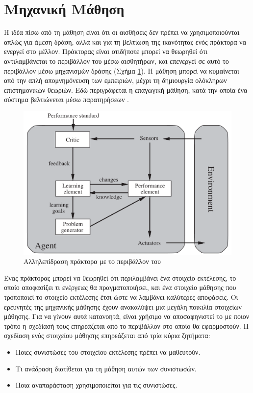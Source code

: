 \section{Μηχανική Μάθηση}

Η ιδέα πίσω από τη μάθηση είναι ότι οι αισθήσεις δεν πρέπει να χρησιμοποιούνται απλώς για άμεση δράση, αλλά και για τη βελτίωση της ικανότητας ενός πράκτορα να ενεργεί στο μέλλον. Πράκτορας είναι οτιδήποτε μπορεί να θεωρηθεί ότι αντιλαμβάνεται το περιβάλλον του μέσω αισθητήρων, και επενεργεί σε αυτό το περιβάλλον μέσω μηχανισμών δράσης (Σχήμα \ref{fig:agent_environment_interaction}). Η μάθηση μπορεί να κυμαίνεται από την απλή απομνημόνευση των εμπειριών, μέχρι τη δημιουργία ολόκληρων επιστημονικών θεωριών. Εδώ περιγράφεται η επαγωγική μάθηση, κατά την οποία ένα σύστημα βελτιώνεται μέσω παρατηρήσεων \cite{Russell1994ArtificialIA}.

\begin{figure}[h]
  \centering
  \includegraphics[width=\textwidth]{images/agent_environment_interaction.png}
  \caption{Αλληλεπίδραση πράκτορα με το περιβάλλον του}
  \label{fig:agent_environment_interaction}
\end{figure}

Ένας πράκτορας μπορεί να θεωρηθεί ότι περιλαμβάνει ένα στοιχείο εκτέλεσης, το οποίο αποφασίζει τι ενέργειες θα πραγματοποιήσει, και ένα στοιχείο μάθησης που τροποποιεί το στοιχείο εκτέλεσης έτσι ώστε να λαμβάνει καλύτερες αποφάσεις. Οι ερευνητές της μηχανικής μάθησης έχουν ανακαλύψει μια μεγάλη ποικιλία στοιχείων μάθησης. Για να γίνουν αυτά κατανοητά, είναι χρήσιμο να αποσαφηνιστεί το με ποιον τρόπο η σχεδίασή τους επηρεάζεται από το περιβάλλον στο οποίο θα εφαρμοστούν. Η σχεδίαση ενός στοιχείου μάθησης επηρεάζεται από τρία κύρια ζητήματα:
\begin{itemize}
    \item Ποιες συνιστώσες του στοιχείου εκτέλεσης πρέπει να μαθευτούν.
    \item Τι ανάδραση διατίθεται για τη μάθηση αυτών των συνιστωσών.
    \item Ποια αναπαράσταση χρησιμοποιείται για τις συνιστώσες.
\end{itemize}{}

